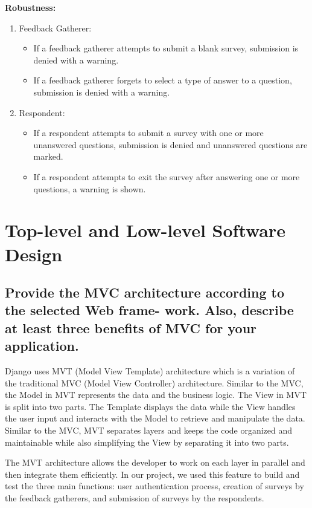 \documentclass[letterpaper, 12 pt, conference]{ieeeconf}
\begin{document}
\hfill \break
\newpage

\textbf{Robustness:}
\begin{enumerate}
    \item[] Feedback Gatherer:
    \begin{itemize}
        \item  If a feedback gatherer attempts to submit a blank survey, submission is denied with a warning.
        \item If a feedback gatherer forgets to select a type of answer to a question, submission is denied with a warning.
    \end{itemize}
    \item[] Respondent:
    \begin{itemize}
        \item If a respondent attempts to submit a survey with one or more unanswered questions, submission is denied and unanswered questions are marked.
        \item If a respondent attempts to exit the survey after answering one or more questions, a warning is shown.
    \end{itemize}
\end{enumerate}

\newpage 
\section{Top-level and Low-level Software Design}
\subsection{Provide the MVC architecture according to the selected Web frame- work. Also, describe at least three benefits of MVC for your application.}
\newline
\hfill

Django uses MVT (Model View Template) architecture which is a variation of the traditional MVC (Model View Controller) architecture. Similar to the MVC, the Model in MVT represents the data and the business logic. The View in MVT is split into two parts. The Template displays the data while the View handles the user input and interacts with the Model to retrieve and manipulate the data. Similar to the MVC, MVT separates layers and keeps the code organized and maintainable while also simplifying the View by separating it into two parts. 
\newline

The MVT architecture allows the developer to work on each layer in parallel and then integrate them efficiently. In our project, we used this feature to build and test the three main functions: user authentication process, creation of surveys by the feedback gatherers, and submission of surveys by the respondents. 
\newline
\end{document}
